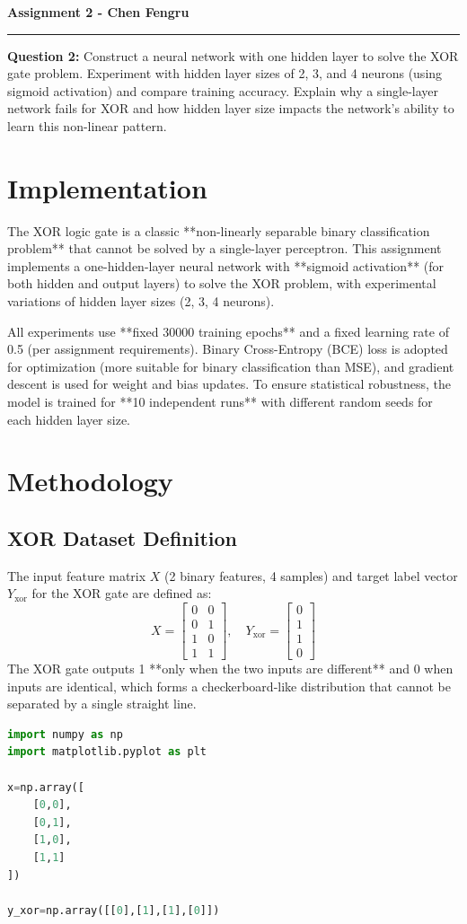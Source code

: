 \documentclass[11pt]{article}
\begin{document}
\noindent\textbf{\Large Assignment 2 - Chen Fengru} \\
\noindent\rule{\textwidth}{0.8pt}

\vspace{0.3cm}
\noindent\textbf{Question 2:} Construct a neural network with one hidden layer to solve the XOR gate problem.
 Experiment with hidden layer sizes of 2, 3, and 4 neurons (using sigmoid activation) and compare training accuracy. 
 Explain why a single-layer network fails for XOR and how hidden layer size impacts the network's ability to learn this non-linear pattern.

\section{Implementation}
The XOR logic gate is a classic **non-linearly separable binary classification problem** that cannot be solved by a single-layer perceptron. 
This assignment implements a one-hidden-layer neural network with **sigmoid activation** (for both hidden and output layers) to solve the XOR problem, with experimental variations of hidden layer sizes (2, 3, 4 neurons). 

All experiments use **fixed 30000 training epochs** and a fixed learning rate of 0.5 (per assignment requirements). 
Binary Cross-Entropy (BCE) loss is adopted for optimization (more suitable for binary classification than MSE), and gradient descent is used for weight and bias updates.
To ensure statistical robustness, the model is trained for **10 independent runs** with different random seeds for each hidden layer size.

\section{Methodology}
\subsection{XOR Dataset Definition}
The input feature matrix $X$ (2 binary features, 4 samples) and target label vector $Y_{\text{xor}}$ for the XOR gate are defined as:
\[
X = \begin{bmatrix}0&0\\0&1\\1&0\\1&1\end{bmatrix}, \quad Y_{\text{xor}} = \begin{bmatrix}0\\1\\1\\0\end{bmatrix}
\]
The XOR gate outputs 1 **only when the two inputs are different** and 0 when inputs are identical, which forms a checkerboard-like distribution that cannot be separated by a single straight line.
\begin{lstlisting}[language=Python, frame=single, caption={XOR Dataset Definition}]
import numpy as np
import matplotlib.pyplot as plt

x=np.array([
    [0,0],
    [0,1],
    [1,0],
    [1,1]
])

y_xor=np.array([[0],[1],[1],[0]])
\end{lstlisting}
\end{document}

